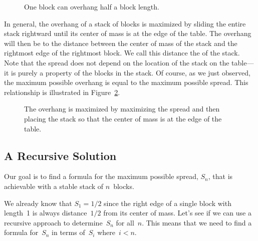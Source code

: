 \begin{figure}



\caption{One block can overhang half a block length.}

\label{fig:one-stable-block}

\end{figure}

In general, the overhang of a stack of blocks is maximized by sliding
the entire stack rightward until its center of mass is at the edge of
the table.  The overhang will then be to the distance between the
center of mass of the stack and the rightmost edge of the rightmost
block.  We call this distance the  of the stack.  Note
that the spread does not depend on the location of the stack on the
table---it is purely a property of the blocks in the stack.  Of
course, as we just observed, the maximum possible overhang is equal to
the maximum possible spread.  This relationship is illustrated in
Figure~\ref{fig:overhang}.

\begin{figure}



\caption{The overhang is maximized by maximizing the spread and then
  placing the stack so that the center of mass is at the edge of the
  table.}

\label{fig:overhang}

\end{figure}

\subsection{A Recursive Solution}

Our goal is to find a formula for the maximum possible spread, $S_n$,
that is achievable with a stable stack of $n$~blocks.

We already know that $S_1 = 1/2$ since the right edge of a single
block with length~1 is always distance~$1/2$ from its center of mass.
Let's see if we can use a recursive approach to determine~$S_n$ for
all~$n$.  This means that we need to find a formula for~$S_n$ in terms
of~$S_i$ where~$i < n$.

